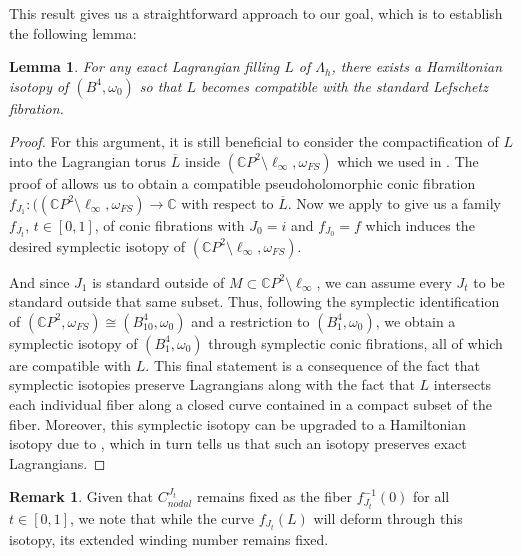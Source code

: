 \documentclass[10pt]{amsart}
\theoremstyle{plain}
\newtheorem{lemma}[thm]{Lemma}
\theoremstyle{definition}
\newtheorem{remark}[thm]{Remark}
\numberwithin{equation}{section}
\newcommand{\C}{\mathbb{C}}
\newcommand{\sse}{\subset}
\newcommand{\sm}{\setminus}
\begin{document}
This result gives us a straightforward approach to our goal, which is to establish the following lemma:

\begin{lemma}\label{lem:backtolefsch}
For any exact Lagrangian filling $L$ of $\Lambda_h$, there exists a Hamiltonian isotopy of $(B^4,\omega_{0})$ so that $L$ becomes compatible with the standard Lefschetz fibration.
\end{lemma}

\begin{proof}
For this argument, it is still beneficial to consider the compactification of $L$ into the Lagrangian torus $\overline{L}$ inside $(\C P^2\sm \ell_\infty,\omega_{FS})$ which we used in . The proof of  allows us to obtain a compatible pseudoholomorphic conic fibration $f_{J_1}:((\C P^2\sm \ell_\infty,\omega_{FS})\to \C$ with respect to $\overline{L}$. Now we apply  to give us a family $f_{J_t}$, $t\in [0,1]$, of conic fibrations with $J_0=i$ and $f_{J_0} = f$ which induces the desired symplectic isotopy of $(\C P^2\sm \ell_\infty,\omega_{FS})$. 

And since $J_1$ is standard outside of $M\sse \C P^2\sm \ell_\infty$, we can assume every $J_t$ to be standard outside that same subset. Thus, following the symplectic identification of $(\C P^2,\omega_{FS})\cong (B^4_{10},\omega_0)$ and a restriction to $(B^4_1,\omega_0)$, we obtain a symplectic isotopy of $(B^4_1,\omega_0)$ through symplectic conic fibrations, all of which are compatible with $L$. This final statement is a consequence of the fact that symplectic isotopies preserve Lagrangians along with the fact that $L$ intersects each individual fiber along a closed curve contained in a compact subset of the fiber. Moreover, this symplectic isotopy can be upgraded to a Hamiltonian isotopy due to \cite[Proposition 0.3]{ST05_Genus2LefschetzFibr}, which in turn tells us that such an isotopy preserves exact Lagrangians.
\end{proof}

\begin{remark}
Given that $C_{nodal}^{J_t}$ remains fixed as the fiber $f_{J_t}^{-1}(0)$ for all $t\in[0,1]$, we note that while the curve $f_{J_t}(L)$ will deform through this isotopy, its extended winding number remains fixed.
\end{remark}
\end{document}
